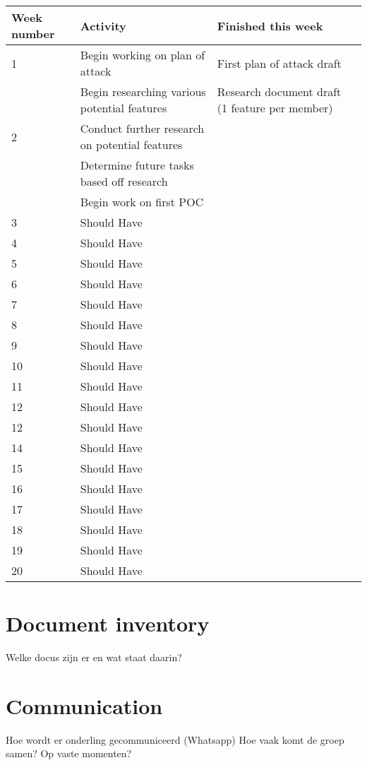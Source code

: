\documentclass{article} %
\begin{document}
    \begin{tabularx}{\textwidth}{|X|X|X|X|}
    \hline
    \textbf{Week number} & \textbf{Activity} & \textbf{Finished this week} \\ \hline
    1 & Begin working on plan of attack & First plan of attack draft \\ \hline
      & Begin researching various potential features & Research document draft (1 feature per member) \\ \hline
    2 & Conduct further research on potential features &  \\ \hline
      & Determine future tasks based off research &  \\ \hline
      & Begin work on first POC & \\ \hline
    3 & Should Have &  \\ \hline
    4 & Should Have &  \\ \hline
    5 & Should Have &  \\ \hline
    6 & Should Have &  \\ \hline
    7 & Should Have &  \\ \hline
    8 & Should Have &  \\ \hline
    9 & Should Have &  \\ \hline
    10 & Should Have &  \\ \hline
    11 & Should Have &  \\ \hline
    12 & Should Have &  \\ \hline
    12 & Should Have &  \\ \hline
    14 & Should Have &  \\ \hline
    15 & Should Have &  \\ \hline
    16 & Should Have &  \\ \hline
    17 & Should Have &  \\ \hline
    18 & Should Have &  \\ \hline
    19 & Should Have &  \\ \hline
    20 & Should Have &  \\ \hline
    \end{tabularx}
    \label{tab:requirements}
    \newpage

    \section{Document inventory}
    Welke docus zijn er en wat staat daarin?
    \newpage

    \section{Communication}
    Hoe wordt er onderling gecommuniceerd (Whatsapp)
    Hoe vaak komt de groep samen? Op vaste momenten?
    \newpage
\end{document}
